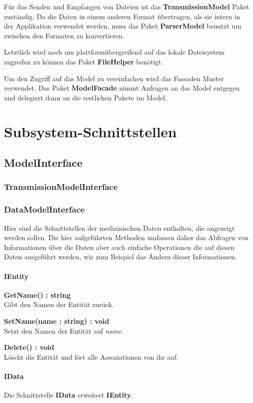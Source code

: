 \documentclass[a4paper]{scrreprt}
\begin{document}
Für das Senden und Empfangen von Dateien ist das \textbf{TransmissionModel} Paket zuständig.
Da die Daten in einem anderen Format übertragen, als sie intern in der Applikation verwendet werden, muss das Paket \textbf{ParserModel} benutzt um zwischen den Formaten zu konvertieren.

Letztlich wird noch um plattformübergreifend auf das lokale Dateisystem zugreifen zu können das Paket \textbf{FileHelper} benötigt.

Um den Zugriff auf das Model zu vereinfachen wird das Fassaden Muster verwendet. Das Paket \textbf{ModelFacade} nimmt Anfragen an das Model entgegen und delegiert dann an die restlichen Pakete im Model.

\section{Subsystem-Schnittstellen}
\subsection{ModelInterface}
\subsubsection{TransmissionModelInterface}
\subsubsection{DataModelInterface}
Hier sind die Schnittstellen der medizinischen Daten enthalten, die angezeigt werden sollen. Die hier aufgeführten Methoden umfassen daher das Abfragen von Informationen über die Daten aber auch einfache Operationen die auf diesen Daten ausgeführt werden, wie zum Beispiel das Ändern dieser Informationen.

\paragraph{IEntity}

\textbf{GetName() : string}\\
Gibt den Namen der Entität zurück.

\textbf{SetName(name : string) : void}\\
Setzt den Namen der Entität auf \textit{name}.

\textbf{Delete() : void}\\
Löscht die Entität und löst alle Assoziationen von ihr auf.

\paragraph{IData}
Die Schnittstelle \textbf{IData} erweitert \textbf{IEntity}.
\end{document}
